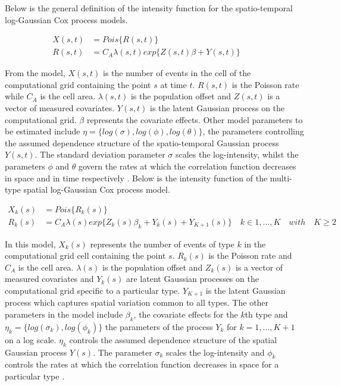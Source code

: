 Below is the general definition of the intensity function for the spatio-temporal log-Gaussian Cox process models.

\begin{align} \label{eqn1}
X(s,t) &= Pois \lbrace R(s,t)\rbrace \nonumber \\
R(s,t) &= C_A \lambda(s,t) exp \lbrace Z(s,t)\beta + Y(s,t)\rbrace \quad \quad
\end{align}

From the model, $X(s,t)$ is the number of events in the cell of the computational grid containing the point $s$ at time $t$. $R(s,t)$ is the Poisson rate while $C_A$ is the cell area. $\lambda(s,t)$ is the population offset and $Z(s,t)$ is a vector of measured covariates. $Y(s,t)$ is the latent Gaussian process on the computational grid.  $\beta$ represents the covariate effects. Other model parameters to be estimated include $\eta = \lbrace log(\sigma),log(\phi),log(\theta) \rbrace$, the parameters controlling the assumed dependence structure of the spatio-temporal Gaussian process $Y(s,t)$. The standard deviation parameter $\sigma$ scales the log-intensity, whilst the parameters $\phi$ and $\theta$ govern the rates at which the correlation function decreases in space and in time respectively \citep{Diggle:2013}. Below is the intensity function of the multi-type spatial log-Gaussian Cox process model.

\begin{align} \label{eqn2}
X_k(s) &= Pois \lbrace R_k(s)\rbrace \nonumber\\
R_k(s) &= C_A \lambda(s) exp \lbrace Z_k(s)\beta_k + Y_k(s) + Y_{K+1}(s)\rbrace \quad k \in 1,...,K \quad  with \quad  K\geq 2
\end{align}


In this model, $X_k(s)$ represents the number of events of type $k$ in the computational grid cell containing the point $s$. $R_k(s)$ is the Poisson rate and $C_A$ is the cell area. $\lambda(s)$ is the population offset and $Z_k(s)$ is a vector of measured covariates and $Y_k(s)$ are latent Gaussian processes on the computational grid specific to a particular type. $Y_{K+1}$ is the latent Gaussian process which captures spatial variation common to all types. The other parameters in the model include $\beta_k$, the covariate effects for the $k$th type and $\eta_k = \lbrace log(\sigma_k),log(\phi_k)\rbrace$ the parameters of the process $Y_k$ for $k = 1,...,K+1$ on a log scale.  $\eta_k$ controls the assumed dependence structure of the spatial Gaussian process $Y(s)$. The parameter $\sigma_k$ scales the log-intensity and $\phi_k$ controls the rates at which the correlation function decreases in space for a particular type \citep{Taylor:2015}.

